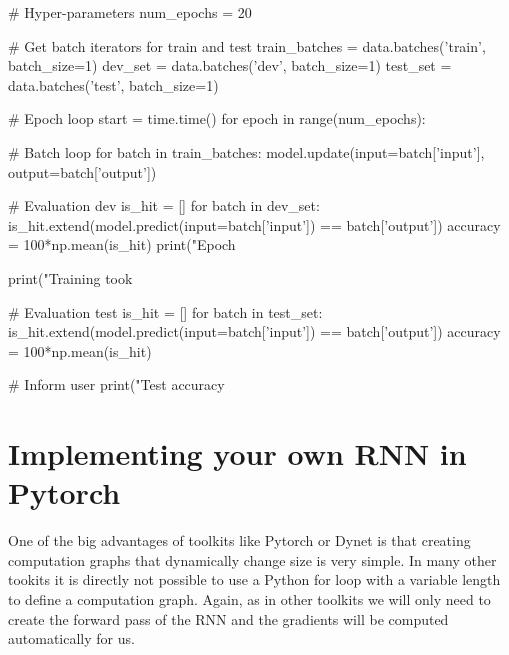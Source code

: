 \begin{exercise}
\begin{python}
# Hyper-parameters
num_epochs = 20

# Get batch iterators for train and test
train_batches = data.batches('train', batch_size=1)
dev_set = data.batches('dev', batch_size=1)
test_set = data.batches('test', batch_size=1)

# Epoch loop
start = time.time()
for epoch in range(num_epochs):

    # Batch loop
    for batch in train_batches:
        model.update(input=batch['input'], output=batch['output'])

    # Evaluation dev
    is_hit = []
    for batch in dev_set:
        is_hit.extend(model.predict(input=batch['input']) == batch['output'])
    accuracy = 100*np.mean(is_hit)
    print("Epoch %

print("Training took %

# Evaluation test
is_hit = []
for batch in test_set:
    is_hit.extend(model.predict(input=batch['input']) == batch['output'])
accuracy = 100*np.mean(is_hit)

# Inform user
print("Test accuracy %
\end{python}
\end{exercise}

\clearpage
\section{Implementing your own RNN in Pytorch}

One of the big advantages of toolkits like Pytorch or Dynet is that creating computation graphs that dynamically change size is very simple. In many other tookits it is directly not possible to use a Python for loop with a variable length to define a computation graph. Again, as in other toolkits we will only need to create the forward pass of the RNN and the gradients will be computed automatically for us.

